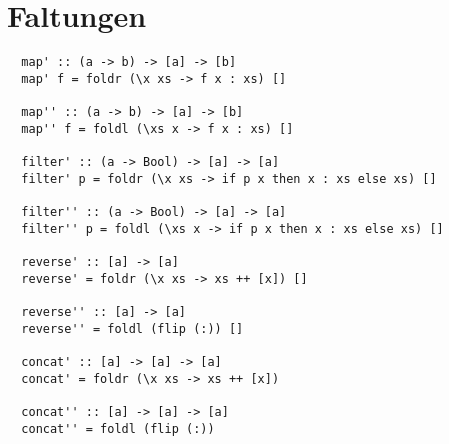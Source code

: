 \documentclass[a4paper]{article}
\begin{document}
\pagebreak

\section{Faltungen}

\begin{lstlisting}
  map' :: (a -> b) -> [a] -> [b]
  map' f = foldr (\x xs -> f x : xs) []

  map'' :: (a -> b) -> [a] -> [b]
  map'' f = foldl (\xs x -> f x : xs) []

  filter' :: (a -> Bool) -> [a] -> [a]
  filter' p = foldr (\x xs -> if p x then x : xs else xs) []

  filter'' :: (a -> Bool) -> [a] -> [a]
  filter'' p = foldl (\xs x -> if p x then x : xs else xs) []

  reverse' :: [a] -> [a]
  reverse' = foldr (\x xs -> xs ++ [x]) []

  reverse'' :: [a] -> [a]
  reverse'' = foldl (flip (:)) []

  concat' :: [a] -> [a] -> [a]
  concat' = foldr (\x xs -> xs ++ [x])

  concat'' :: [a] -> [a] -> [a]
  concat'' = foldl (flip (:))
\end{lstlisting}
\end{document}
